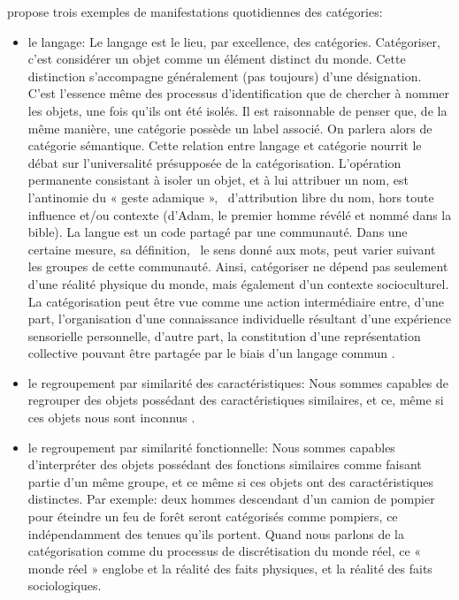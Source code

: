 \citep{anderson1991adaptive} propose trois exemples de manifestations quotidiennes des catégories:

\begin{itemize}

\item le langage: Le langage est le lieu, par excellence, des catégories. Catégoriser, c'est considérer un objet comme un élément distinct du monde. Cette distinction s'accompagne généralement (pas toujours) d'une désignation. C'est l'essence même des processus d'identification que de chercher à nommer les objets, une fois qu'ils ont été isolés. Il est raisonnable de penser que, de la même manière, une catégorie possède un label associé. On parlera alors de catégorie sémantique. Cette relation entre langage et catégorie nourrit le débat sur l'universalité présupposée de la catégorisation. L'opération permanente consistant à isoler un objet, et à lui attribuer un nom, est l'antinomie du « geste adamique », \ie~d'attribution libre du nom, hors toute influence et/ou contexte (d'Adam, le premier homme révélé et nommé dans la bible). La langue est un code partagé par une communauté. Dans une certaine mesure, sa définition, \ie~le sens donné aux mots, peut varier suivant les groupes de cette communauté. Ainsi, catégoriser ne dépend pas seulement d'une réalité physique du monde, mais également d'un contexte socioculturel. La catégorisation peut être vue comme une action intermédiaire entre, d'une part, l'organisation d'une connaissance individuelle résultant d'une expérience sensorielle personnelle, d'autre part, la constitution d'une représentation collective pouvant être partagée par le biais d'un langage commun \citep{dubois2006cognitive}.
\item le regroupement par similarité des caractéristiques: Nous sommes capables de regrouper des objets possédant des caractéristiques similaires, et ce, même si ces objets nous sont inconnus \citep{fried1984induction}.
\item le regroupement par similarité fonctionnelle: Nous sommes capables d'interpréter des objets possédant des fonctions similaires comme faisant partie d'un même groupe, et ce même si ces objets ont des caractéristiques distinctes. Par exemple: deux hommes descendant d'un camion de pompier pour éteindre un feu de forêt seront catégorisés comme pompiers, ce indépendamment des tenues qu'ils portent. Quand nous parlons de la catégorisation comme du processus de discrétisation du monde réel, ce « monde réel » englobe et la réalité des faits physiques, et la réalité des faits sociologiques.
\end{itemize}

